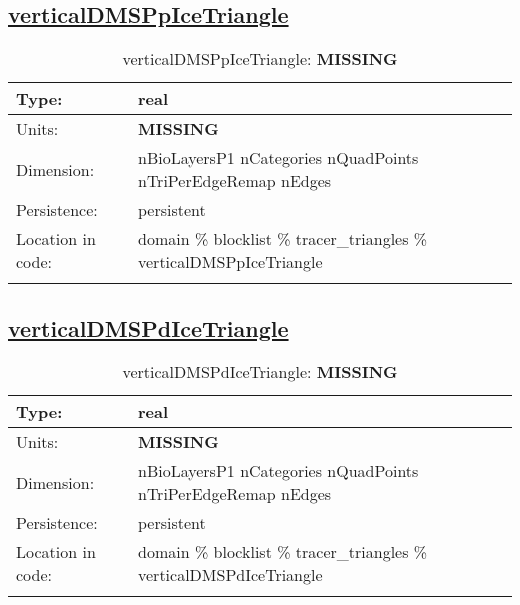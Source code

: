 \subsection[verticalDMSPpIceTriangle]{\hyperref[sec:var_tab_tracer_triangles]{verticalDMSPpIceTriangle}}
\label{subsec:var_sec_tracer_triangles_verticalDMSPpIceTriangle}
\begin{center}
\begin{longtable}{| p{2.0in} | p{4.0in} |}
        \hline 
        Type: & real \\
        \hline 
        Units: & {\bf \color{red} MISSING} \\
        \hline 
        Dimension: & nBioLayersP1 nCategories nQuadPoints nTriPerEdgeRemap nEdges \\
        \hline 
        Persistence: & persistent \\
        \hline 
         Location in code: & domain \% blocklist \% tracer\_triangles \% verticalDMSPpIceTriangle \\
         \hline 
    \caption{verticalDMSPpIceTriangle: {\bf \color{red} MISSING}}
\end{longtable}
\end{center}
\subsection[verticalDMSPdIceTriangle]{\hyperref[sec:var_tab_tracer_triangles]{verticalDMSPdIceTriangle}}
\label{subsec:var_sec_tracer_triangles_verticalDMSPdIceTriangle}
\begin{center}
\begin{longtable}{| p{2.0in} | p{4.0in} |}
        \hline 
        Type: & real \\
        \hline 
        Units: & {\bf \color{red} MISSING} \\
        \hline 
        Dimension: & nBioLayersP1 nCategories nQuadPoints nTriPerEdgeRemap nEdges \\
        \hline 
        Persistence: & persistent \\
        \hline 
         Location in code: & domain \% blocklist \% tracer\_triangles \% verticalDMSPdIceTriangle \\
         \hline 
    \caption{verticalDMSPdIceTriangle: {\bf \color{red} MISSING}}
\end{longtable}
\end{center}
